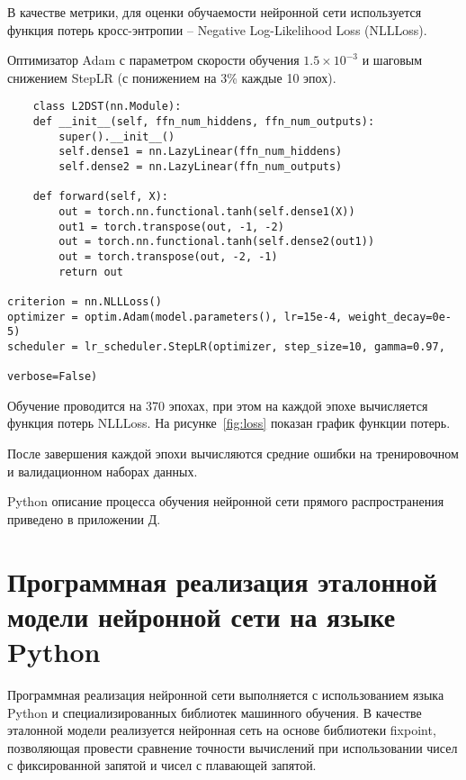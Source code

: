 В качестве метрики, для оценки обучаемости нейронной сети используется функция 
потерь кросс-энтропии – {Negative Log-Likelihood Loss (NLLLoss)}.

Оптимизатор {Adam} с параметром скорости обучения \(1.5 \times 10^{-3}\) и 
шаговым снижением {StepLR} (с понижением на 3\% каждые 10 эпох).
 
\small
\fontsize{12pt}{12pt}\selectfont
\begin{verbatim}
    class L2DST(nn.Module):
    def __init__(self, ffn_num_hiddens, ffn_num_outputs):
        super().__init__()
        self.dense1 = nn.LazyLinear(ffn_num_hiddens)
        self.dense2 = nn.LazyLinear(ffn_num_outputs)

    def forward(self, X):
        out = torch.nn.functional.tanh(self.dense1(X))
        out1 = torch.transpose(out, -1, -2)
        out = torch.nn.functional.tanh(self.dense2(out1))
        out = torch.transpose(out, -2, -1)
        return out

criterion = nn.NLLLoss() 
optimizer = optim.Adam(model.parameters(), lr=15e-4, weight_decay=0e-5)
scheduler = lr_scheduler.StepLR(optimizer, step_size=10, gamma=0.97, 
                                                         verbose=False)
\end{verbatim}
\normalsize
\fontsize{14pt}{14pt}\selectfont


Обучение проводится на 370 эпохах, при этом на каждой эпохе вычисляется функция
потерь {NLLLoss}. На рисунке~\ref{fig:loss} показан график функции потерь.


После завершения каждой эпохи вычисляются средние ошибки на тренировочном и 
валидационном наборах данных.  

Python описание процесса обучения нейронной сети прямого распространения 
приведено в приложении Д.

\section{Программная реализация эталонной модели нейронной сети на языке Python}
\hspace*{12.5 mm}Программная реализация нейронной сети выполняется с 
использованием языка Python и специализированных библиотек машинного обучения.  
В качестве эталонной модели реализуется нейронная сеть на основе библиотеки 
{fixpoint}, позволяющая провести сравнение точности вычислений при 
использовании чисел с фиксированной запятой и чисел с плавающей запятой.

